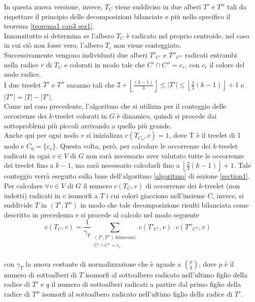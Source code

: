 In questa nuova versione, invece, $ T_C $ viene suddiviso in due alberi $ T' $ e $ T'' $ tali da  rispettare il principio delle decomposizioni bilanciate e pi\`u nello specifico il teorema \ref{teorema1 cap3 sez1}.\\
Innanzitutto si determina se l'albero $ T_C $ \`e radicato nel proprio centroide, nel caso in cui ci\`o non fosse vero, l'albero $ T_c $ non viene conteggiato.\\
Successivamente vengono individuati due alberi $ T'_{C'} $ e $ T''_{C''} $ radicati entrambi nella radice $ r $ di $ T_C $ e colorati in modo tale che $ C' \cap C'' = c_r $, con $ c_r $ il colore del nodo radice.\\
I due treelet $ T' $ e $ T'' $ saranno tali che $2+ \left\lfloor \frac{(k-1)}{3}  \right\rfloor \le |T'| \le \left\lfloor \frac{2}{3}(k-1) \right\rfloor  +1 $ e $ |T''| = |T| -|T'| $.\\
Come nel caso precedente, l'algoritmo che si utilizza per il conteggio delle occorrenze dei $ k $-treelet colorati in $ G $ \`e dinamico, quindi si procede dai sottoproblemi pi\`u piccoli arrivando a quello pi\`u grande.\\
Anche qui per ogni nodo $ v $ si inizializza $ c(T_{C_0} , v) = 1 $, dove T \`e il treelet di 1 nodo e $ C_0 = \{c_v\} $.
Questa volta, per\`o, per calcolare le occorrenze dei $ k $-treelet radicati in ogni $ v \in V $ di $ G $ non sar\`a necessario aver valutato tutte le occorrenze dei treelet fino a $ k-1 $, ma sar\`a necessario calcolarli fino a $ \left\lfloor \frac{2}{3}(k-1)\right\rfloor +1 $.
Tale conteggio verr\`a eseguito sulla base dell'algoritmo \ref{algoritmo} di sezione \ref{section1}. \\
Per calcolare $ \forall v \in V  $ di $ G $ il numero $ c(T_C,v) $ di occorrenze dei $ k $-treelet (non indotti) radicati in $ v $ isomorfi a $ T $ i cui colori giacciono nell'insieme $ C $, invece, si suddivide $ T $ in $ (T',T'') $ in modo che tale decomposizione risulti bilanciata come descritto in precedenza e si procede al calcolo nel modo seguente\\
\[c(T_C,v) = \frac{1}{\gamma_T}\sum_{\substack{{(T',T'') \ bilanciati}\\{C' \cap C'' = c_r}}} c(T'_{C'},v)\cdot c(T''_{C''},v) \] \\
con $\gamma_T$ la nuova costante di normalizzazione che \`e uguale a $ \binom{p}{q} $, dove $ p  $ \`e il numero di sottoalberi di $ T $ isomorfi al sottoalbero radicato nell'ultimo figlio della radice di $ T' $ e $ q $ il numero di sottoalberi radicati a partire dal primo figlio della radice di $ T'' $ isomorfi al sottoalbero radicato nell'ultimo figlio della radice di $ T' $.
